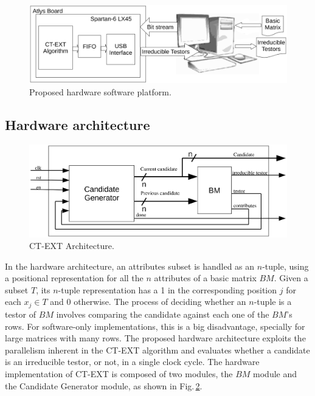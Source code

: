 \documentclass[authoryear,preprint,review,12pt]{elsarticle}
\begin{document}
\begin{figure}[htb]
    \begin{center}
       \includegraphics[width=13cm]{Arquitecture.eps}
    \end{center}
\caption{Proposed hardware software platform.}
\label{figArq}
\end{figure}

\subsection{Hardware architecture}
\label{sect:4}

\begin{figure}[htb]
    \begin{center}
        \includegraphics[width=13cm]{CT-ext_arq.eps}
    \end{center}
\caption{CT-EXT Architecture.}
\label{fig:3}
\end{figure}

In the hardware architecture, an attributes subset is handled as an $n$-tuple, using a positional 
representation for all the $n$ attributes of a basic matrix $BM$. Given a subset $T$, its $n$-tuple representation 
has a 1 in the corresponding position $j$ for each $x_j \in T$ and 0 otherwise.
The process of deciding whether an $n$-tuple is a testor of $BM$ involves
comparing the candidate against each one of the $BM$'s rows. For
software-only implementations, this is a big disadvantage, specially for large 
matrices with many rows. The proposed hardware architecture exploits the parallelism 
inherent in the CT-EXT algorithm
and evaluates whether a candidate is an irreducible testor, or not, in a single
clock cycle. The hardware implementation of CT-EXT is composed of two modules, the $BM$ module and the Candidate Generator module, as shown in
Fig.\,\ref{fig:3}. 
\end{document}
